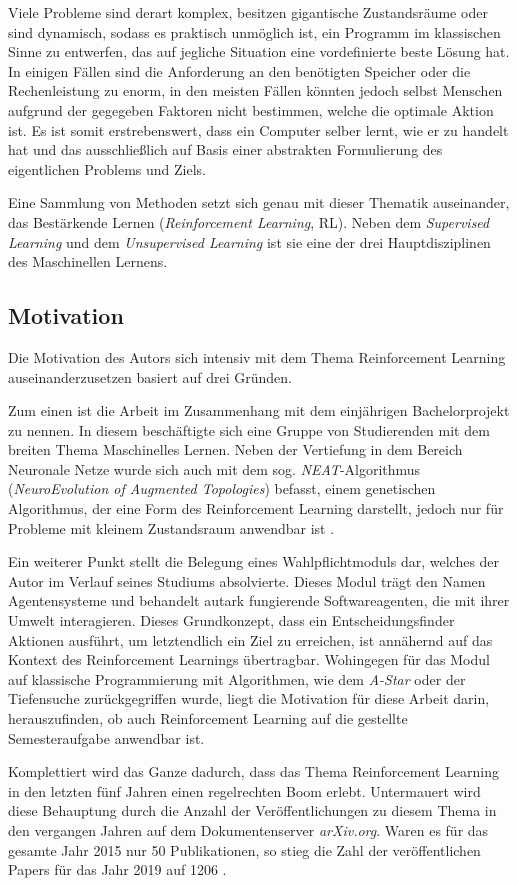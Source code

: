 Viele Probleme sind derart komplex, besitzen gigantische Zustandsräume oder sind dynamisch, sodass es praktisch unmöglich ist, ein Programm im klassischen Sinne zu entwerfen, das auf jegliche Situation eine vordefinierte beste Lösung hat. In einigen Fällen sind die Anforderung an den benötigten Speicher oder die Rechenleistung zu enorm, in den meisten Fällen könnten jedoch selbst Menschen aufgrund der gegegeben Faktoren nicht bestimmen, welche die optimale Aktion ist. Es ist somit erstrebenswert, dass ein Computer selber lernt, wie er zu handelt hat und das ausschließlich auf Basis  einer abstrakten Formulierung des eigentlichen Problems und Ziels. \par 
Eine Sammlung von Methoden setzt sich genau mit dieser Thematik auseinander, das Bestärkende Lernen (\textit{Reinforcement Learning}, RL). Neben dem \textit{Supervised Learning} und dem \textit{Unsupervised Learning} ist sie eine der drei Hauptdisziplinen des Maschinellen Lernens.


\subsection{Motivation}
Die Motivation des Autors sich intensiv mit dem Thema Reinforcement Learning auseinanderzusetzen basiert auf drei Gründen.
\par 
Zum einen ist die Arbeit im Zusammenhang mit dem einjährigen Bachelorprojekt zu nennen. In diesem beschäftigte sich eine Gruppe von Studierenden mit dem breiten Thema \glqq Maschinelles Lernen\grqq{}. Neben der Vertiefung in dem Bereich \glqq Neuronale Netze\grqq{} wurde sich auch mit dem sog. \textit{NEAT}-Algorithmus (\textit{NeuroEvolution of Augmented Topologies}) befasst, einem genetischen Algorithmus, der eine Form des Reinforcement Learning darstellt, jedoch nur für Probleme mit kleinem Zustandsraum anwendbar ist \cite[S.~7f]{Sutton1998}.
\par
Ein weiterer Punkt stellt die Belegung eines Wahlpflichtmoduls dar, welches der Autor im Verlauf seines Studiums absolvierte. Dieses Modul trägt den Namen \glqq Agentensysteme\grqq{} und behandelt autark fungierende Softwareagenten, die mit ihrer Umwelt interagieren. Dieses Grundkonzept, dass ein Entscheidungsfinder Aktionen ausführt, um letztendlich ein Ziel zu erreichen, ist annähernd auf das Kontext des Reinforcement Learnings übertragbar. Wohingegen für das Modul auf \glqq klassische\grqq{} Programmierung mit Algorithmen, wie dem \textit{A-Star} oder der Tiefensuche zurückgegriffen wurde, liegt die Motivation für diese Arbeit darin, herauszufinden, ob auch Reinforcement Learning auf die gestellte Semesteraufgabe anwendbar ist.
\par
Komplettiert wird das Ganze dadurch, dass das Thema Reinforcement Learning in den letzten fünf Jahren einen regelrechten Boom erlebt. Untermauert wird diese Behauptung durch die Anzahl der Veröffentlichungen zu diesem Thema in den vergangen Jahren auf dem Dokumentenserver \textit{arXiv.org}. Waren es für das gesamte Jahr 2015 nur 50 Publikationen, so stieg die Zahl der veröffentlichen Papers für das Jahr 2019 auf 1206 \cite[]{arxiv}.



